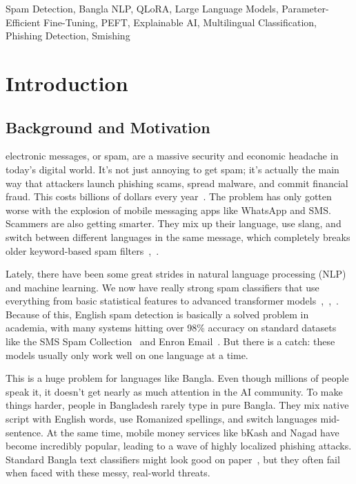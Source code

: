 \documentclass[journal]{IEEEtran}
\begin{document}
\begin{IEEEkeywords}
Spam Detection, Bangla NLP, QLoRA, Large Language Models, Parameter-Efficient Fine-Tuning, PEFT, Explainable AI, Multilingual Classification, Phishing Detection, Smishing
\end{IEEEkeywords}

\section{Introduction}

\subsection{Background and Motivation}

 electronic messages, or spam, are a massive security and economic headache in today's digital world. It's not just annoying to get spam; it's actually the main way that attackers launch phishing scams, spread malware, and commit financial fraud. This costs billions of dollars every year~\cite{ref1}. The problem has only gotten worse with the explosion of mobile messaging apps like WhatsApp and SMS. Scammers are also getting smarter. They mix up their language, use slang, and switch between different languages in the same message, which completely breaks older keyword-based spam filters~\cite{ref5},~\cite{ref6}.

Lately, there have been some great strides in natural language processing (NLP) and machine learning. We now have really strong spam classifiers that use everything from basic statistical features to advanced transformer models~\cite{ref4},~\cite{ref7},~\cite{ref9}. Because of this, English spam detection is basically a solved problem in academia, with many systems hitting over 98\% accuracy on standard datasets like the SMS Spam Collection~\cite{ref1} and Enron Email~\cite{ref9}. But there is a catch: these models usually only work well on one language at a time.

This is a huge problem for languages like Bangla. Even though millions of people speak it, it doesn't get nearly as much attention in the AI community. To make things harder, people in Bangladesh rarely type in pure Bangla. They mix native script with English words, use Romanized spellings, and switch languages mid-sentence. At the same time, mobile money services like bKash and Nagad have become incredibly popular, leading to a wave of highly localized phishing attacks. Standard Bangla text classifiers might look good on paper~\cite{ref7}, but they often fail when faced with these messy, real-world threats.
\end{document}

